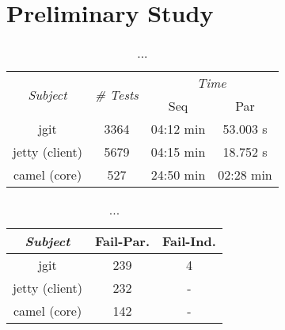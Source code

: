 \section{Preliminary Study}

\begin{table}
  \centering
  \begin{tabular}{|c|c|c|c|}
    \hline
    \multirow{2}{*}{\emph{Subject}} & \multirow{2}{*}{\emph{\# Tests}} &  \multicolumn{2}{c|}{\emph{Time}}\\
    \cline{3-4}
    & & Seq & Par \\
    \hline
    jgit & 3364 & 04:12 min & 53.003 s \\
    \hline
    jetty (client) & 5679 & 04:15 min & 18.752 s \\
    \hline
    camel (core) & 527 & 24:50 min & 02:28 min \\
    \hline
  \end{tabular}
  \caption{\label{table:cost}...}
\end{table}

\begin{table}
  \centering
  \begin{tabular}{|c|c|c|}
    \hline
    \emph{Subject} & Fail-Par. & Fail-Ind. \\
    \hline
    jgit & 239 & 4 \\
    \hline
    jetty (client) & 232 & - \\
    \hline
    camel (core) & 142 & - \\
    \hline
  \end{tabular}
  \caption{\label{table:failures}...}
\end{table}


